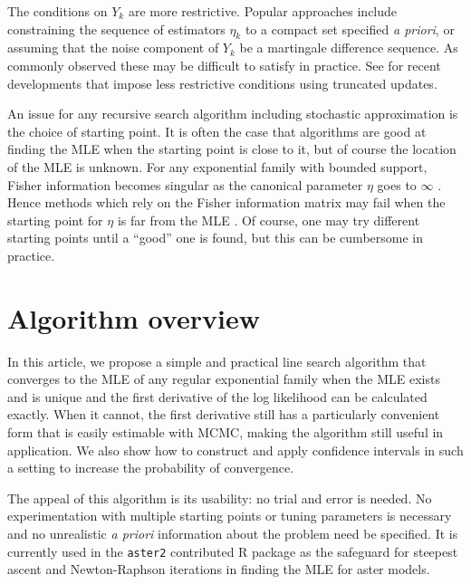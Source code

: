 \documentclass[oneside]{myumnStatThesis}
\begin{document}
The conditions on $Y_k$ are more restrictive.  Popular approaches include constraining the sequence of estimators $
\eta_k$ to a compact set specified \emph{a priori}, or assuming that the noise component of $Y_k$ be a martingale 
difference sequence.  As commonly observed \citep{Chen:2002,Andrieu:2005,Liang:2010} these may be 
difficult to satisfy in practice.  
See \citep{Andrieu:2005,Liang:2010} for recent developments that impose less restrictive conditions using truncated 
updates.

An issue for any recursive search algorithm including stochastic approximation is the choice of starting point.  It is 
often the case that algorithms are good at finding the MLE when the starting point is close to it, but of course the 
location of the MLE is unknown.  For any exponential family with bounded support, Fisher information 
becomes singular as the canonical parameter $\eta$ goes to $\infty$ \citep{Rinaldo:2009}.  Hence methods which rely on 
the Fisher information matrix may fail when the starting point for $\eta$ is far from the MLE \citep{Younes:1989,Gu:2001}.
Of course, one may try different starting points until a ``good'' one is found, but this can be cumbersome in 
practice.

\section{Algorithm overview} 
In this article, we propose a simple and practical line search algorithm that converges to the MLE of any regular 
exponential family when the MLE exists and is unique and the first derivative of the log likelihood can be calculated 
exactly.  
When it cannot, the first derivative still has a particularly convenient form that is easily estimable with MCMC, 
making the algorithm still useful in application.  We also show how to construct and apply confidence intervals in such 
a setting to increase the probability of convergence.  

The appeal of this algorithm is its usability: no trial and error is needed.  
No experimentation with multiple starting points or tuning parameters is necessary and
no unrealistic \emph{a priori} information about the problem need be specified.  
It is currently used in the \texttt{aster2} contributed R package 
\citep{aster:R} as the safeguard for steepest ascent and Newton-Raphson iterations in finding the MLE for aster models.
\end{document}
